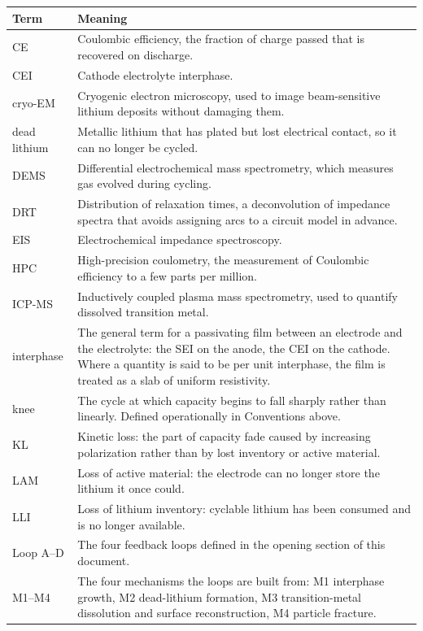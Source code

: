 \documentclass[11pt,a4paper]{article}
\renewcommand{\arraystretch}{1.15}
\begin{document}
\begingroup\small
\setlength{\tabcolsep}{3pt}
\renewcommand{\arraystretch}{1.12}
\sloppy
\begin{longtable}{@{}>{\raggedright\arraybackslash}p{}>{\raggedright\arraybackslash}p{}@{}}
\hline
\textbf{Term} & \textbf{Meaning} \\ \hline
\endhead
CE & Coulombic efficiency, the fraction of charge passed that is recovered on discharge. \\
CEI & Cathode electrolyte interphase. \\
cryo-EM & Cryogenic electron microscopy, used to image beam-sensitive lithium deposits without damaging them. \\
dead lithium & Metallic lithium that has plated but lost electrical contact, so it can no longer be cycled. \\
DEMS & Differential electrochemical mass spectrometry, which measures gas evolved during cycling. \\
DRT & Distribution of relaxation times, a deconvolution of impedance spectra that avoids assigning arcs to a circuit model in advance. \\
EIS & Electrochemical impedance spectroscopy. \\
HPC & High-precision coulometry, the measurement of Coulombic efficiency to a few parts per million. \\
ICP-MS & Inductively coupled plasma mass spectrometry, used to quantify dissolved transition metal. \\
interphase & The general term for a passivating film between an electrode and the electrolyte: the SEI on the anode, the CEI on the cathode. Where a quantity is said to be per unit interphase, the film is treated as a slab of uniform resistivity. \\
knee & The cycle at which capacity begins to fall sharply rather than linearly. Defined operationally in Conventions above. \\
KL & Kinetic loss: the part of capacity fade caused by increasing polarization rather than by lost inventory or active material. \\
LAM & Loss of active material: the electrode can no longer store the lithium it once could. \\
LLI & Loss of lithium inventory: cyclable lithium has been consumed and is no longer available. \\
Loop A--D & The four feedback loops defined in the opening section of this document. \\
M1--M4 & The four mechanisms the loops are built from: M1 interphase growth, M2 dead-lithium formation, M3 transition-metal dissolution and surface reconstruction, M4 particle fracture. \\

\end{longtable}
\end{document}

